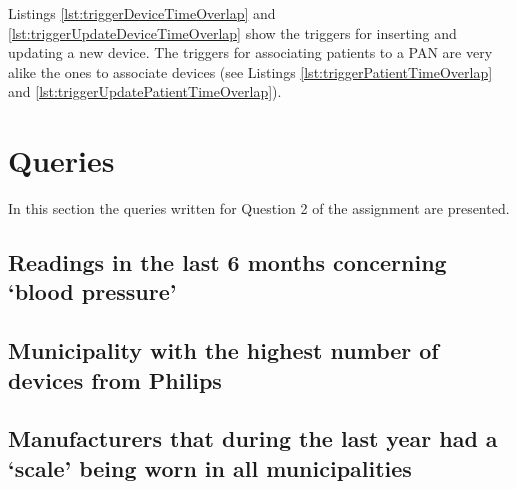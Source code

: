 \documentclass[a4paper,11pt]{article}
\begin{document}
Listings \ref{lst:triggerDeviceTimeOverlap} and \ref{lst:triggerUpdateDeviceTimeOverlap} show the triggers for inserting and updating a new device. The triggers for associating patients to a PAN are very alike the ones to associate devices (see Listings \ref{lst:triggerPatientTimeOverlap} and \ref{lst:triggerUpdatePatientTimeOverlap}).


 

 



 


\pagebreak
\section{Queries}

In this section the queries written for Question 2 of the assignment are presented.

\subsection{Readings in the last 6 months concerning `blood pressure'}





\pagebreak
\subsection{Municipality with the highest number of devices from Philips}





\pagebreak
\subsection{Manufacturers that during the last year had a `scale' being worn in all municipalities}
\end{document}
